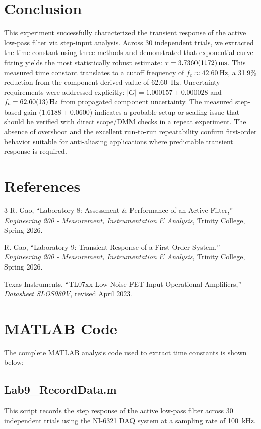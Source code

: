\documentclass[11pt]{article}
\begin{document}
\section{Conclusion}
This experiment successfully characterized the transient response of the active low-pass filter via step-input analysis. Across 30 independent trials, we extracted the time constant using three methods and demonstrated that exponential curve fitting yields the most statistically robust estimate: $\tau = \SI{3.7360 \pm 0.1172}{\milli\second}$. This measured time constant translates to a cutoff frequency of $f_c \approx \SI{42.60}{\hertz}$, a 31.9\% reduction from the component-derived value of \SI{62.60}{\hertz}. Uncertainty requirements were addressed explicitly: $|G| = 1.000157 \pm 0.000028$ and $f_c = \SI{62.60 \pm 0.13}{\hertz}$ from propagated component uncertainty. The measured step-based gain ($1.6188 \pm 0.0600$) indicates a probable setup or scaling issue that should be verified with direct scope/DMM checks in a repeat experiment. The absence of overshoot and the excellent run-to-run repeatability confirm first-order behavior suitable for anti-aliasing applications where predictable transient response is required.

\section{References}
\begin{thebibliography}{3}
  R. Gao, ``Laboratory 8: Assessment \& Performance of an Active Filter,'' \textit{Engineering 200 - Measurement, Instrumentation \& Analysis}, Trinity College, Spring 2026.

  R. Gao, ``Laboratory 9: Transient Response of a First-Order System,'' \textit{Engineering 200 - Measurement, Instrumentation \& Analysis}, Trinity College, Spring 2026.

  Texas Instruments, ``TL07xx Low-Noise FET-Input Operational Amplifiers,'' \textit{Datasheet SLOS080V}, revised April 2023.
\end{thebibliography}

\newpage
\appendix
\section{MATLAB Code}

The complete MATLAB analysis code used to extract time constants is shown below:

\subsection{Lab9\_RecordData.m}
This script records the step response of the active low-pass filter across 30 independent trials using the NI-6321 DAQ system at a sampling rate of \SI{100}{\kilo\hertz}.

\end{document}
